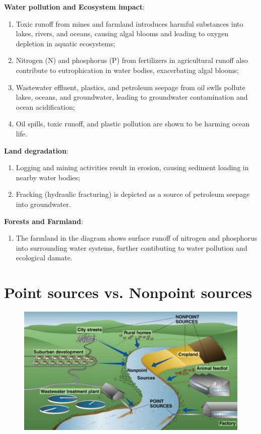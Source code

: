 \documentclass{article}
\newcommand{\cfig}[1]{%
  \begin{figure}[ht!]%
    \centering%
    #1%
  \end{figure}%
}
\begin{document}
\textbf{Water pollution and Ecosystem impact}:
\begin{enumerate}
    \item Toxic runoff from mines and farmland introduces harmful substances into lakes,
        rivers, and oceans, causing algal blooms and leading to oxygen depletion
        in aquatic ecosystems;
    \item Nitrogen (N) and phosphorus (P) from fertilizers in agricultural runoff also
        contribute to eutrophication in water bodies, exacerbating algal blooms;
    \item Wastewater effluent, plastics, and petroleum seepage from oil swlls pollute lakes,
        oceans, and groundwater, leading to groundwater contamination and ocean acidification;
    \item Oil spills, toxic runoff, and plastic pollution are shown to be harming ocean life.
\end{enumerate}

\textbf{Land degradation}:
\begin{enumerate}
    \item Logging and mining activities result in erosion, causing sediment loading in nearby water bodies;
    \item Fracking (hydraulic fracturing) is depicted as a source of petroleum seepage into groundwater.
\end{enumerate}

\textbf{Forests and Farmland}:
\begin{enumerate}
    \item The farmland in the diagram shows surface runoff of nitrogen and phosphorus
        into surrounding water systems, further contibuting to water pollution
        and ecological damate.
\end{enumerate}

\section{Point sources vs. Nonpoint sources}
\cfig{\includegraphics*[width=.8\textwidth]{media/Point-and-nonpoint.png}}
\end{document}
